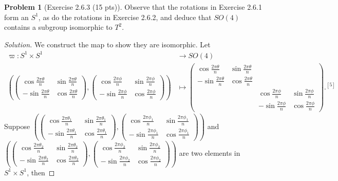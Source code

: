 \documentclass{article}
\theoremstyle{definition}
\newtheorem{problem}{Problem}
\theoremstyle{plain}
\begin{document}
\begin{problem}[Exercise 2.6.3 (15 pts)]Observe that the rotations in Exercise 2.6.1 form an $S^1$, as do the rotations in Exercise 2.6.2, and deduce that $SO(4)$ contains a subgroup isomorphic to $T^2$.
\end{problem}
\begin{adjustwidth}{0.7cm}{}
\color{blue}
\begin{proof}[Solution]We construct the map to show they are isomorphic. Let
\begin{align*}
\varpi:S^1\times S^1&\to SO(4)\\
\left(\begin{pmatrix}\cos\frac{2\pi\theta}{n}&\sin\frac{2\pi\theta}{n}\\ -\sin\frac{2\pi\theta}{n}&\cos\frac{2\pi\theta}{n}\end{pmatrix},\begin{pmatrix}\cos\frac{2\pi\phi}{n}&\sin\frac{2\pi\phi}{n}\\ -\sin\frac{2\pi\phi}{n}&\cos\frac{2\pi\phi}{n}\end{pmatrix}\right)&\mapsto\begin{pmatrix}\cos\frac{2\pi\theta}{n}&\sin\frac{2\pi\theta}{n}&&\\ -\sin\frac{2\pi\theta}{n}&\cos\frac{2\pi\theta}{n}&&\\ &&\cos\frac{2\pi\phi}{n}&\sin\frac{2\pi\phi}{n}\\ &&-\sin\frac{2\pi\phi}{n}&\cos\frac{2\pi\phi}{n}\end{pmatrix}.^{[5]}
\end{align*}
Suppose $\left(\begin{pmatrix}\cos\frac{2\pi\theta_1}{n}&\sin\frac{2\pi\theta_1}{n}\\ -\sin\frac{2\pi\theta_1}{n}&\cos\frac{2\pi\theta_1}{n}\end{pmatrix},\begin{pmatrix}\cos\frac{2\pi\phi_1}{n}&\sin\frac{2\pi\phi_1}{n}\\ -\sin\frac{2\pi\phi_1}{n}&\cos\frac{2\pi\phi_1}{n}\end{pmatrix}\right)$ and $\left(\begin{pmatrix}\cos\frac{2\pi\theta_2}{n}&\sin\frac{2\pi\theta_2}{n}\\ -\sin\frac{2\pi\theta_2}{n}&\cos\frac{2\pi\theta_2}{n}\end{pmatrix},\begin{pmatrix}\cos\frac{2\pi\phi_2}{n}&\sin\frac{2\pi\phi_2}{n}\\ -\sin\frac{2\pi\phi_2}{n}&\cos\frac{2\pi\phi_2}{n}\end{pmatrix}\right)$ are two elements in $S^1\times S^1$, then

\end{proof}
\end{adjustwidth}
\end{document}
